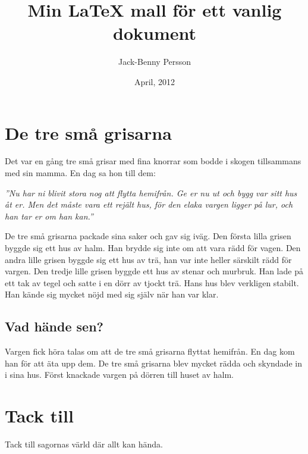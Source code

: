 \documentclass[11pt,a4paper,swedish]{article}
\title{Min \LaTeX{} mall för ett vanlig dokument}
\author{Jack-Benny Persson}
\date{April, 2012}
\begin{document}
\maketitle
\pagebreak

\tableofcontents

\pagebreak

\section{De tre små grisarna}

Det var en gång tre små grisar med fina knorrar som bodde i skogen tillsammans 
med sin mamma. En dag sa hon till dem:

\textit{''Nu har ni blivit stora nog att flytta hemifrån. Ge er nu ut och bygg 
var sitt hus åt er. Men det måste vara ett rejält hus, för den elaka vargen 
ligger på lur, och han tar er om han kan.''}

De tre små grisarna packade sina saker och gav sig iväg.
Den första lilla grisen byggde sig ett hus av halm. Han brydde sig inte om att 
vara rädd för vagen. Den andra lille grisen byggde sig ett hus av trä, han var 
inte heller särskilt rädd för vargen. Den tredje lille grisen byggde ett hus av 
stenar och murbruk. Han lade på ett tak av tegel och satte i en dörr av tjockt 
trä. Hans hus blev verkligen stabilt. Han kände sig mycket nöjd med sig själv 
när han var klar.

\subsection{Vad hände sen?}

Vargen fick höra talas om att de tre små grisarna flyttat hemifrån. En dag kom 
han för att äta upp dem. De tre små grisarna blev mycket rädda och skyndade in 
i sina hus.
Först knackade vargen på dörren till huset av halm.

\section{Tack till}

Tack till sagornas värld där allt kan hända.
\end{document}
